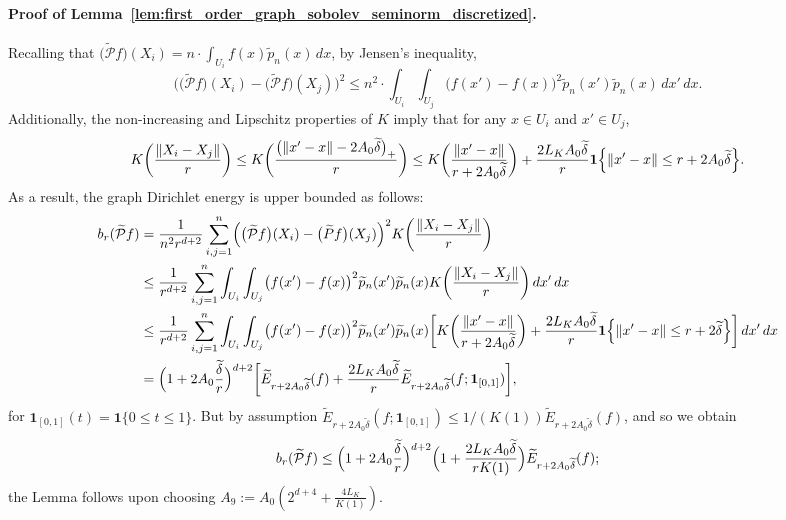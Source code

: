 \documentclass[twoside]{article}
\newcommand{\1}{\mathbf{1}}
\newcommand{\mc}[1]{\mathcal{#1}}
\newcommand{\wt}[1]{\widetilde{#1}}
\theoremstyle{definition}
\theoremstyle{remark}
\begin{document}
\paragraph{Proof of Lemma~\ref{lem:first_order_graph_sobolev_seminorm_discretized}.}
Recalling that $\bigl(\wt{\mc{P}}f\bigr)(X_i) = n \cdot \int_{U_i} f(x) \wt{p}_n(x) \,dx$, by Jensen's inequality,
\begin{equation*}
\biggl(\bigl(\wt{\mc{P}}f\bigr)(X_i) - \bigl(\wt{\mc{P}}f\bigr)(X_j)\biggr)^2 \leq n^2 \cdot \int_{U_i} \int_{U_j} \bigl(f(x') - f(x)\bigr)^2 \wt{p}_n(x') \wt{p}_n(x) \,dx' \,dx.
\end{equation*}
Additionally, the non-increasing and Lipschitz properties of $K$ imply that for any $x \in U_i$ and $x' \in U_j$, 
\begin{equation*}
K\biggl(\frac{\|X_i - X_j\|}{r}\biggr) \leq K\biggl(\frac{\bigl(\|x' - x\| - 2A_0\wt{\delta}\bigr)_{+}}{r}\biggr) \leq K\biggl(\frac{\|x' - x\|}{r + 2A_0\wt{\delta}}\biggr) + \frac{2L_KA_0\wt{\delta}}{r}\1\Bigl\{\|x' - x\| \leq r + 2A_0\wt{\delta}\Bigr\}.
\end{equation*}
As a result, the graph Dirichlet energy is upper bounded as follows:
\begin{align*}
b_r(\wt{\mc{P}}f) & = \frac{1}{n^2r^{d + 2}} \sum_{i,j = 1}^n \Bigl(\bigl(\wt{\mc{P}}f\bigr)(X_i) - \bigl(\wt{P}f\bigr)(X_j)\Bigr)^2 K\biggl(\frac{\|X_i - X_j\|}{r}\biggr) \\
& \leq \frac{1}{r^{d + 2}} \sum_{i,j = 1}^n \int_{U_i} \int_{U_j}  \bigl(f(x') - f(x)\bigr)^2 \wt{p}_n(x') \wt{p}_n(x) K\biggl(\frac{\|X_i - X_j\|}{r}\biggr) \,dx' \,dx \\
& \leq \frac{1}{r^{d + 2}} \sum_{i,j = 1}^n \int_{U_i} \int_{U_j}  \bigl(f(x') - f(x)\bigr)^2 \wt{p}_n(x') \wt{p}_n(x) \biggl[K\biggl(\frac{\|x' - x\|}{r + 2A_0\wt{\delta}}\biggr) + \frac{2L_KA_0\wt{\delta}}{r}\1\Bigl\{\|x' - x\| \leq r + 2\wt{\delta}\Bigr\}\biggr] \,dx' \,dx \\
& = \Bigl(1 + 2A_0\frac{\wt{\delta}}{r}\Bigr)^{d + 2}\biggl[\wt{E}_{r + 2A_0\wt{\delta}}(f) + \frac{2L_KA_0\wt{\delta}}{r}\wt{E}_{r + 2A_0\wt{\delta}}(f; \1_{[0,1]})\biggr],
\end{align*}
for $\1_{[0,1]}(t) = \1\{0 \leq t \leq 1\}$. But by assumption $\wt{E}_{r + 2A_0\wt\delta}(f; \1_{[0,1]}) \leq 1/(K(1))\wt{E}_{r + 2A_0\wt{\delta}}(f)$, and so we obtain
\begin{equation*}
b_r(\wt{\mc{P}}f) \leq \Bigl(1 + 2A_0\frac{\wt{\delta}}{r}\Bigr)^{d + 2} \Bigl(1 + \frac{2L_KA_0\wt{\delta}}{rK(1)}\Bigr) \wt{E}_{r + 2A_0\wt{\delta}}(f);
\end{equation*}
the Lemma follows upon choosing $A_9 := A_0(2^{d + 4} + \frac{4L_K}{K(1)})$.
\end{document}
